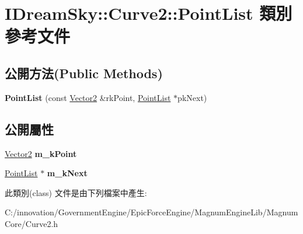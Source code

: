 \hypertarget{class_i_dream_sky_1_1_curve2_1_1_point_list}{}\section{I\+Dream\+Sky\+:\+:Curve2\+:\+:Point\+List 類別 參考文件}
\label{class_i_dream_sky_1_1_curve2_1_1_point_list}
\subsection*{公開方法(Public Methods)}
\begin{DoxyCompactItemize}
\item 
{\bfseries Point\+List} (const \hyperlink{class_i_dream_sky_1_1_vector2}{Vector2} \&rk\+Point, \hyperlink{class_i_dream_sky_1_1_curve2_1_1_point_list}{Point\+List} $\ast$pk\+Next)\hypertarget{class_i_dream_sky_1_1_curve2_1_1_point_list_a5db9a973b27dcbc3dc964dedc0d93dfe}{}\label{class_i_dream_sky_1_1_curve2_1_1_point_list_a5db9a973b27dcbc3dc964dedc0d93dfe}

\end{DoxyCompactItemize}
\subsection*{公開屬性}
\begin{DoxyCompactItemize}
\item 
\hyperlink{class_i_dream_sky_1_1_vector2}{Vector2} {\bfseries m\+\_\+k\+Point}\hypertarget{class_i_dream_sky_1_1_curve2_1_1_point_list_aaced3fa29563e548fa0ab0f9eda7b867}{}\label{class_i_dream_sky_1_1_curve2_1_1_point_list_aaced3fa29563e548fa0ab0f9eda7b867}

\item 
\hyperlink{class_i_dream_sky_1_1_curve2_1_1_point_list}{Point\+List} $\ast$ {\bfseries m\+\_\+k\+Next}\hypertarget{class_i_dream_sky_1_1_curve2_1_1_point_list_ae376725598a6bd1e68f3e0b77e4b5380}{}\label{class_i_dream_sky_1_1_curve2_1_1_point_list_ae376725598a6bd1e68f3e0b77e4b5380}

\end{DoxyCompactItemize}


此類別(class) 文件是由下列檔案中產生\+:\begin{DoxyCompactItemize}
\item 
C\+:/innovation/\+Government\+Engine/\+Epic\+Force\+Engine/\+Magnum\+Engine\+Lib/\+Magnum\+Core/Curve2.\+h\end{DoxyCompactItemize}
